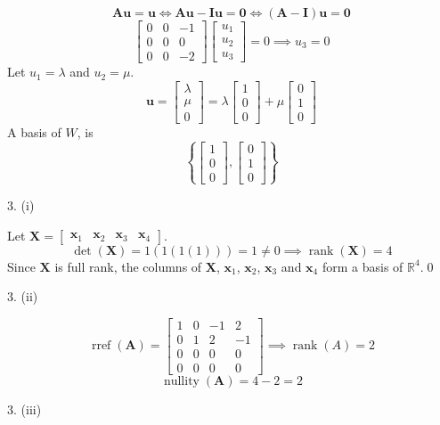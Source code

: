 \documentclass[a4paper]{article}
\newcommand{\vv}{\mathbf}
\newcommand{\rank}{\operatorname{rank}}
\newcommand{\rref}{\operatorname{rref}}
\newcommand{\nullity}{\operatorname{nullity}}
\begin{document}
\[\vv A\vv u=\vv u\iff\vv A\vv u-\vv I\vv u=\vv0\iff(\vv A-\vv I)\vv u=\vv0\]
\[\begin{bmatrix}0&0&-1\\0&0&0\\0&0&-2\end{bmatrix}
\begin{bmatrix}u_1\\u_2\\u_3\end{bmatrix}=0\implies u_3=0\]
Let \(u_1=\lambda\) and \(u_2=\mu\).
\[\vv u=\begin{bmatrix}\lambda\\\mu\\0\end{bmatrix}
=\lambda\begin{bmatrix}1\\0\\0\end{bmatrix}+\mu\begin{bmatrix}0\\1\\0\end{bmatrix}\]
A basis of \(W\), is
\[\boxed{\left\{\begin{bmatrix}1\\0\\0\end{bmatrix},
\begin{bmatrix}0\\1\\0\end{bmatrix}\right\}}\]


3. (i)

Let \(\vv X=\begin{bmatrix}\vv x_1&\vv x_2&\vv x_3&\vv x_4\end{bmatrix}\).
\[\det(\vv X)=1(1(1(1)))=1\ne0\implies \rank(\vv X)=4\]
Since \(\vv X\) is full rank, the columns of \(\vv X\), \(\vv x_1\), \(\vv x_2\), \(\vv x_3\) and \(\vv x_4\) form a basis of \(\mathbb R^4\).\qed


3. (ii)

\[\rref(\vv A)=\begin{bmatrix}
        1&0&-1&2\\
        0&1&2&-1\\
        0&0&0&0\\
        0&0&0&0
\end{bmatrix}
\implies\rank(A)=\boxed2\]
\[\nullity(\vv A)=4-2=\boxed2\]


3. (iii)
\end{document}
